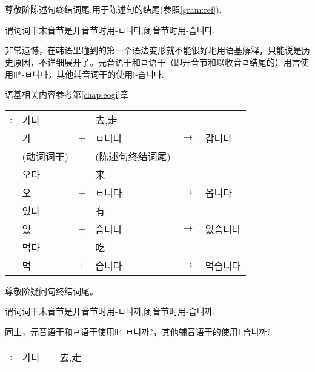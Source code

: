 \section{\kr{}}
\begin{grammar}
    \begin{grammarsect}
        \begin{itemize}
            \item 尊敬阶陈述句终结词尾,用于陈述句的结尾(参照\ref{gram:ref}).
            \item 谓词词干末音节是开音节时用{\kr -ㅂ니다},闭音节时用{\kr -습니다.}
            {\color{gray} \item 非常遗憾，在韩语里碰到的第一个语法变形就不能很好地用语基解释，只能说是历史原因，不详细展开了。元音语干和ㄹ语干（即开音节和以收音ㄹ结尾的）用言使用Ⅱ*{\kr -ㅂ니다}，其他辅音词干的使用Ⅰ{\kr -습니다.}}语基相关内容参考第\ref{chap:eogi}章
        \end{itemize}
        \begin{tabular}{llllll}
            \kr \ruby{例}{예}:&\kr 가다&&去,走\\
            &\kr 가&+&\kr ㅂ니다&$\to$&\kr 갑니다\\
            &(动词词干)&&(陈述句终结词尾)\\
            &\kr 오다&&来\\
            &\kr 오&+&\kr ㅂ니다&$\to$&\kr 옵니다\\
            &\kr 있다&&有\\
            &\kr 있&+&\kr 습니다&$\to$&\kr 있습니다\\
            &\kr 먹다&&吃\\
            &\kr 먹&+&\kr 습니다&$\to$&\kr 먹습니다\\
        \end{tabular}
    \end{grammarsect}
    \begin{grammarsect}
        \begin{itemize}
            \item 尊敬阶疑问句终结词尾。
            \item 谓词词干末音节是开音节时用-ㅂ니까,闭音节时用-습니까.
            {\color{gray} \item 同上，元音语干和ㄹ语干使用Ⅱ*{\kr -ㅂ니까?}，其他辅音语干的使用Ⅰ{\kr -습니까?}}
        \end{itemize}
        \begin{tabular}{llllll}
            \kr \ruby{例}{예}:&\kr 가다&&去,走\\

\end{tabular}
\end{grammarsect}
\end{grammar}
